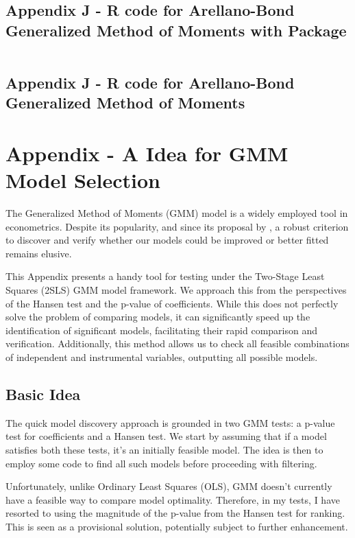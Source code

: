 \documentclass[12pt]{article}
\begin{document}
\newpage
\subsection{Appendix J - R code for Arellano-Bond Generalized Method of Moments with Package}
\begin{lstlisting}[language=R]

\end{lstlisting}


\newpage
\subsection{Appendix J - R code for Arellano-Bond Generalized Method of Moments}



\newpage
{}
\section{Appendix - A Idea for GMM Model Selection}
\hypertarget{thesentence}{The Generalized Method of Moments (GMM) model is a widely employed tool in econometrics. Despite its popularity, and since its proposal by \cite{hansen1982large}, a robust criterion to discover and verify whether our models could be improved or better fitted remains elusive.} 

This Appendix presents a handy tool for testing under the Two-Stage Least Squares (2SLS) GMM model framework. We approach this from the perspectives of the Hansen test and the p-value of coefficients. While this does not perfectly solve the problem of comparing models, it can significantly speed up the identification of significant models, facilitating their rapid comparison and verification. Additionally, this method allows us to check all feasible combinations of independent and instrumental variables, outputting all possible models.

\subsection{Basic Idea}

The quick model discovery approach is grounded in two GMM tests: a p-value test for coefficients and a Hansen test. We start by assuming that if a model satisfies both these tests, it's an initially feasible model. The idea is then to employ some code to find all such models before proceeding with filtering.

Unfortunately, unlike Ordinary Least Squares (OLS), GMM doesn't currently have a feasible way to compare model optimality. Therefore, in my tests, I have resorted to using the magnitude of the p-value from the Hansen test for ranking. This is seen as a provisional solution, potentially subject to further enhancement.
\end{document}
